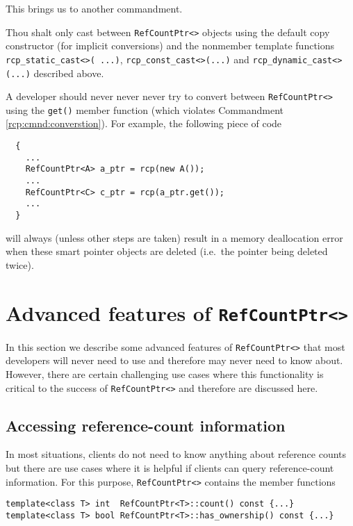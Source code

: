 This brings us to another commandment.

\begin{commandment}\label{rcp:cmnd:converstion}
Thou shalt only cast between {}\texttt{Ref\-Count\-Ptr<>} objects using the
default copy constructor (for implicit conversions) and the nonmember
template functions {}\texttt{rcp\-\_static\-\_cast<>( ...)},
{}\texttt{rcp\-\_const\-\_cast<>(...)} and
{}\texttt{rcp\-\_dynamic\-\_cast<>(...)}  described above.
\end{commandment}

A developer should never never never try to convert between
{}\texttt{Ref\-Count\-Ptr<>} using the {}\texttt{get()} member function
(which violates Commandment {}\ref{rcp:cmnd:converstion}).  For
example, the following piece of code

{\scriptsize\begin{verbatim}
  {
    ...
    RefCountPtr<A> a_ptr = rcp(new A());
    ...
    RefCountPtr<C> c_ptr = rcp(a_ptr.get());
    ...
  }
\end{verbatim}}

{}\noindent{}will always (unless other steps are taken) result in a
memory deallocation error when these smart pointer objects are deleted
(i.e.~the pointer being deleted twice).

%
\section{Advanced features of {}\texttt{Ref\-Count\-Ptr<>}}
%

In this section we describe some advanced features of
{}\texttt{Ref\-Count\-Ptr<>} that most developers will never need to
use and therefore may never need to know about.  However, there are
certain challenging use cases where this functionality is critical to
the success of {}\texttt{Ref\-Count\-Ptr<>} and therefore are
discussed here.

%
\subsection{Accessing reference-count information}
%

In most situations, clients do not need to know anything about
reference counts but there are use cases where it is helpful if
clients can query reference-count information.  For this purpose,
{}\texttt{Ref\-Count\-Ptr<>} contains the member functions

{\scriptsize\begin{verbatim}
template<class T> int  RefCountPtr<T>::count() const {...}
template<class T> bool RefCountPtr<T>::has_ownership() const {...}
\end{verbatim}}

